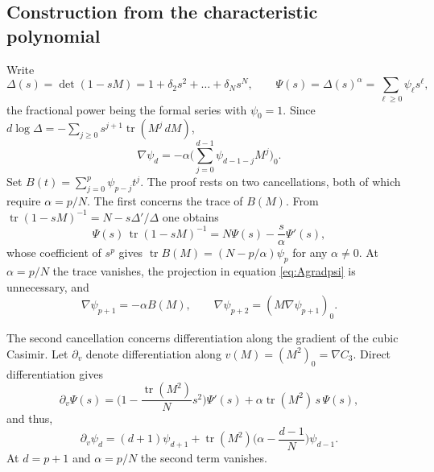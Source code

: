 \documentclass[10pt,reqno]{amsart}
\numberwithin{equation}{section}
\theoremstyle{plain}
\theoremstyle{definition}
\DeclareMathOperator{\tr}{tr}
\begin{document}
\subsection{Construction from the characteristic polynomial}\label{sec:Aconstruction}

Write
\begin{equation*}
	\Delta(s)=\det(1-sM)=1+\delta_2s^2+\dots+\delta_Ns^N,\qquad \Psi(s)=\Delta(s)^\alpha=\sum_{\ell\ge0}\psi_\ell s^\ell,
\end{equation*}
the fractional power being the formal series with $\psi_0=1$. Since $d\log\Delta=-\sum_{j\ge0}s^{j+1}\tr(M^j\,dM)$,
\begin{equation}\label{eq:Agradpsi}
	\nabla\psi_d=-\alpha\Big(\sum_{j=0}^{d-1}\psi_{d-1-j}M^j\Big)_0 .
\end{equation}
Set $B(t)=\sum_{j=0}^p\psi_{p-j}t^j$. The proof rests on two cancellations, both of which require $\alpha=p/N$. The first concerns the trace of $B(M)$. From $\tr(1-sM)^{-1}=N-s\Delta'/\Delta$ one obtains
\begin{equation*}
	\Psi(s)\,\tr(1-sM)^{-1}=N\Psi(s)-\frac s\alpha\Psi'(s),
\end{equation*}
whose coefficient of $s^p$ gives $\tr B(M)=(N-p/\alpha)\psi_p$ for any $\alpha\neq0$. At $\alpha=p/N$ the trace vanishes, the projection in equation \eqref{eq:Agradpsi} is unnecessary, and
\begin{equation}\label{eq:AgradP}
	\nabla\psi_{p+1}=-\alpha B(M),\qquad \nabla\psi_{p+2}=(M\nabla\psi_{p+1})_0 .
\end{equation}

The second cancellation concerns differentiation along the gradient of the cubic Casimir. Let $\partial_v$ denote differentiation along $v(M)=(M^2)_0=\nabla C_3$. Direct differentiation gives
\begin{equation*}
	\partial_v\Psi(s)=\Big(1-\frac{\tr(M^2)}Ns^2\Big)\Psi'(s)+\alpha\tr(M^2)\,s\,\Psi(s),
\end{equation*}
and thus,
\begin{equation*}
	\partial_v\psi_d=(d+1)\psi_{d+1}+\tr(M^2)\Big(\alpha-\frac{d-1}N\Big)\psi_{d-1}.
\end{equation*}
At $d=p+1$ and $\alpha=p/N$ the second term vanishes.
\end{document}
